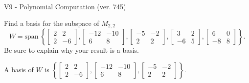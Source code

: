 \begin{exercise}
  \begin{exerciseTitle}V9 - Polynomial Computation (ver. 745)\end{exerciseTitle}
  \begin{exerciseStatement}
    Find a basis for the subspace of \(M_{2,2}\) 
\[W=\mathrm{span}\ \left\{\left[\begin{array}{cc}
2 & 2 \\
2 & -6
\end{array}\right] , \left[\begin{array}{cc}
-12 & -10 \\
6 & 8
\end{array}\right] , \left[\begin{array}{cc}
-5 & -2 \\
2 & 2
\end{array}\right] , \left[\begin{array}{cc}
3 & 2 \\
-6 & 5
\end{array}\right] , \left[\begin{array}{cc}
6 & 0 \\
-8 & 8
\end{array}\right]\right\}.\]
 Be sure to explain why your result is a basis.


  \end{exerciseStatement}
  \begin{exerciseAnswer}
   A basis of \(W\) is  \(\left\{\left[\begin{array}{cc}
2 & 2 \\
2 & -6
\end{array}\right] , \left[\begin{array}{cc}
-12 & -10 \\
6 & 8
\end{array}\right] , \left[\begin{array}{cc}
-5 & -2 \\
2 & 2
\end{array}\right]\right\}\).
  


  \end{exerciseAnswer}
\end{exercise}